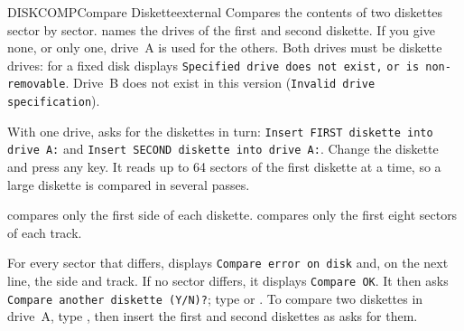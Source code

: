 \begin{DosEntry}{DISKCOMP}{Compare Diskette}{external}
\Purpose Compares the contents of two diskettes sector by sector.
\Format {}
\Remarks
{} names the drives of the first and second diskette.  If you give
none, or only one, drive~A is used for the others.  Both drives must be
diskette drives: for a fixed disk  displays
\texttt{Specified drive does not exist,} \texttt{or is non-removable}.  Drive~B
does not exist in this version (\texttt{Invalid drive specification}).

With one drive,  asks for the diskettes in turn:
\texttt{Insert FIRST diskette into drive A:} and \texttt{Insert SECOND
diskette into drive A:}.  Change the diskette and press any key.  It reads
up to 64 sectors of the first diskette at a time, so a large diskette is
compared in several passes.

 compares only the first side of each diskette.  
compares only the first eight sectors of each track.

For every sector that differs,  displays
\texttt{Compare error on disk} and, on the next line, the side and track.
If no sector differs, it displays \texttt{Compare OK}.  It then asks
\texttt{Compare another diskette (Y/N)?}; type  or .
\Example
To compare two diskettes in drive~A, type , then
insert the first and second diskettes as  asks for them.
\end{DosEntry}

